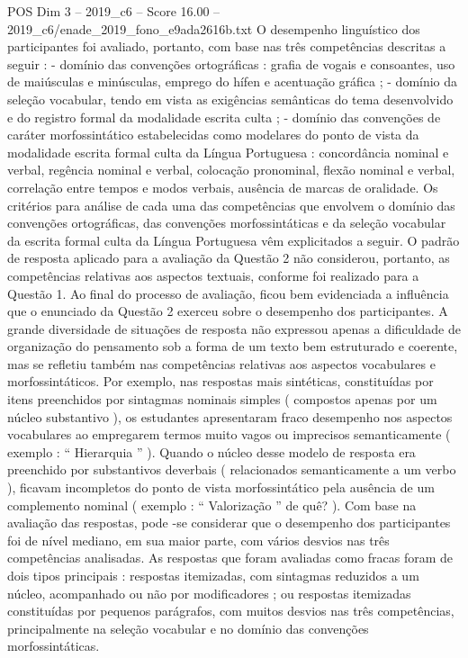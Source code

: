 \begin{textsample}{POS Dim 3 – 2019\_c6 – Score 16.00 – 2019\_c6/enade\_2019\_fono\_e9ada2616b.txt}
O desempenho linguístico dos participantes foi avaliado, portanto, com base nas três competências descritas a seguir : - domínio das convenções ortográficas : grafia de vogais e consoantes, uso de maiúsculas e minúsculas, emprego do hífen e acentuação gráfica ; - domínio da seleção vocabular, tendo em vista as exigências semânticas do tema desenvolvido e do registro formal da modalidade escrita culta ; - domínio das convenções de caráter morfossintático estabelecidas como modelares do ponto de vista da modalidade escrita formal culta da Língua Portuguesa : concordância nominal e verbal, regência nominal e verbal, colocação pronominal, flexão nominal e verbal, correlação entre tempos e modos verbais, ausência de marcas de oralidade.
Os critérios para análise de cada uma das competências que envolvem o domínio das convenções ortográficas, das convenções morfossintáticas e da seleção vocabular da escrita formal culta da Língua Portuguesa vêm explicitados a seguir.
O padrão de resposta aplicado para a avaliação da Questão 2 não considerou, portanto, as competências relativas aos aspectos textuais, conforme foi realizado para a Questão 1.
Ao final do processo de avaliação, ficou bem evidenciada a influência que o enunciado da Questão 2 exerceu sobre o desempenho dos participantes.
A grande diversidade de situações de resposta não expressou apenas a dificuldade de organização do pensamento sob a forma de um texto bem estruturado e coerente, mas se refletiu também nas competências relativas aos aspectos vocabulares e morfossintáticos.
Por exemplo, nas respostas mais sintéticas, constituídas por itens preenchidos por sintagmas nominais simples ( compostos apenas por um núcleo substantivo ), os estudantes apresentaram fraco desempenho nos aspectos vocabulares ao empregarem termos muito vagos ou imprecisos semanticamente ( exemplo : “ Hierarquia ” ).
Quando o núcleo desse modelo de resposta era preenchido por substantivos deverbais ( relacionados semanticamente a um verbo ), ficavam incompletos do ponto de vista morfossintático pela ausência de um complemento nominal ( exemplo : “ Valorização ” de quê? ).
Com base na avaliação das respostas, pode -se considerar que o desempenho dos participantes foi de nível mediano, em sua maior parte, com vários desvios nas três competências analisadas.
As respostas que foram avaliadas como fracas foram de dois tipos principais : respostas itemizadas, com sintagmas reduzidos a um núcleo, acompanhado ou não por modificadores ; ou respostas itemizadas constituídas por pequenos parágrafos, com muitos desvios nas três competências, principalmente na seleção vocabular e no domínio das convenções morfossintáticas.

\end{textsample}
